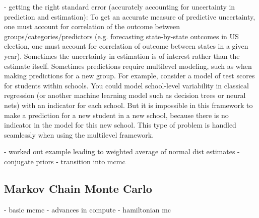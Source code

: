 - getting the right standard error (accurately accounting for uncertainty in prediction and estimation): To get an accurate measure of predictive uncertainty, one must account for correlation of the outcome between groups/categories/predictors (e.g. forecasting state-by-state outcomes in US election, one must account for correlation of outcome between states in a given year). Sometimes the uncertainty in estimation is of interest rather than the estimate itself. Sometimes predictions require multilevel modeling, such as when making predictions for a new group. For example, consider a model of test scores for students within schools. You could model school-level variability in classical regression (or another machine learning model such as decision trees or neural nets) with an indicator for each school. But it is impossible in this framework to make a prediction for a new student in a new school, because there is no indicator in the model for this new school. This type of problem is handled seamlessly when using the multilevel framework.

- worked out example leading to weighted average of normal dist estimates
- conjugate priors
- transition into mcmc

\subsection{Markov Chain Monte Carlo}

- basic mcmc
- advances in compute
- hamiltonian mc